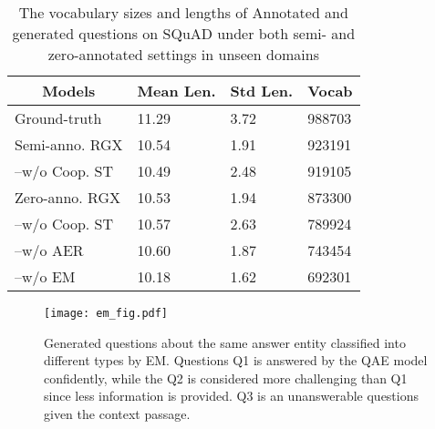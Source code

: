 \documentclass[11pt,a4paper]{article}
\begin{document}
\begin{table}[h]
\small
\centering
\begin{tabular}{@{}llll@{}}
\toprule
\multicolumn{1}{c}{\textbf{Models}} & \multicolumn{1}{c}{\textbf{Mean Len.}} & \multicolumn{1}{c}{\textbf{Std Len.}} & \multicolumn{1}{c}{\textbf{Vocab}} \\ \midrule

Ground-truth               & 11.29                          & 3.72                          & 988703                         \\
Semi-anno. RGX               & 10.54                          & 1.91                          & 923191                         \\
--w/o Coop. ST               & 10.49                          & 2.48                          & 919105                         \\
Zero-anno. RGX               & 10.53                          & 1.94                          & 873300                         \\
--w/o Coop. ST               & 10.57                          & 2.63                          & 789924                         \\
--w/o AER               & 10.60                          & 1.87                          & 743454                        \\
--w/o EM               & 10.18                          & 1.62                          & 692301                          \\
\bottomrule
\end{tabular}
\caption{The vocabulary sizes and lengths of Annotated and generated questions on SQuAD under both semi- and zero-annotated settings in unseen domains}
\label{tab:ques-stat}
\end{table}

\begin{figure}[t]
\centering
\texttt{[image: em\_fig.pdf]}
\caption{Generated questions about the same answer entity classified into different types by EM. Questions Q1 is answered by the QAE model confidently, while the Q2 is considered more challenging than Q1 since less information is provided. Q3 is an unanswerable questions given the context passage.}
\label{fig:em_example}
\end{figure}
\end{document}
